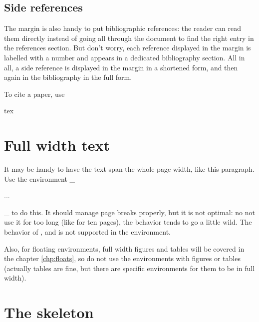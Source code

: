\documentclass[
    11pt,
]{tufte-style-thesis}
\begin{document}
\subsection{Side references}

The margin is also handy to put bibliographic references: the reader can read them directly instead of going all through the document to find the right entry in the references section. But don't worry, each reference displayed in the margin is labelled with a number and appears in a dedicated bibliography section. All in all, a side reference is displayed in the margin in a shortened form, and then again in the bibliography in the full form.

To cite a paper, use
\begin{codebox}{tex}
\end{codebox}


\section{Full width text}

\begin{wide}
It may be handy to have the text span the whole page width, like this paragraph. Use the environment _\begin{wide}...\end{wide}_ to do this. It should manage page breaks properly, but it is not optimal: no not use it for too long (like for ten pages), the behavior tends to go a little wild. The behavior of ,  and  is not supported in the  environment.

Also, for floating environments, full width figures and tables will be covered in the chapter \ref{chp:floats}, so do not use the  environments with figures or tables (actually tables are fine, but there are specific environments for them to be in full width).
\end{wide}

\section{The skeleton}
\end{document}

